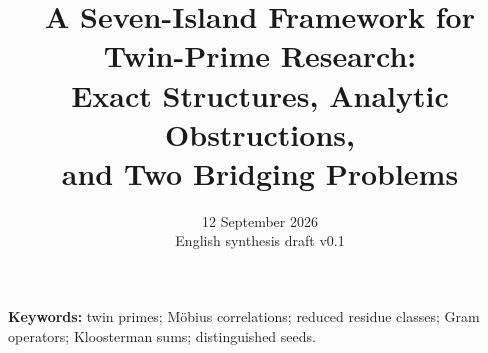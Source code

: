\documentclass[11pt,a4paper]{article}
\title{A Seven-Island Framework for Twin-Prime Research:\\
Exact Structures, Analytic Obstructions,\\and Two Bridging Problems}
\author{}
\date{12 September 2026\\English synthesis draft v0.1}
\theoremstyle{definition}
\theoremstyle{remark}
\begin{document}
\pagestyle{plain}
\maketitle
\begin{abstract}

\end{abstract}
\noindent\textbf{Keywords:} twin primes; M\"obius correlations; reduced residue classes; Gram operators; Kloosterman sums; distinguished seeds.
\clearpage
\setcounter{tocdepth}{1}
\tableofcontents
\clearpage









\clearpage
\appendix


\clearpage
{}
{}
\begingroup\raggedright


\endgroup
\end{document}
